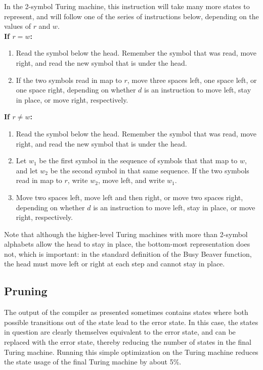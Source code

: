 \documentclass[11pt]{report}
\begin{document}
In the 2-symbol Turing machine, this instruction will take many more states to represent, and will follow one of the series of instructions below, depending on the values of $r$ and $w$. \\

\textbf{If $r = w$:}

\begin{enumerate}

\item Read the symbol below the head. Remember the symbol that was read, move right, and read the new symbol that is under the head. 
\item If the two symbols read in map to $r$, move three spaces left, one space left, or one space right, depending on whether $d$ is an instruction to move left, stay in place, or move right, respectively.

\end{enumerate}

\textbf{If $r \not= w$:}

\begin{enumerate}

\item Read the symbol below the head. Remember the symbol that was read, move right, and read the new symbol that is under the head.
\item Let $w_1$ be the first symbol in the sequence of symbols that that map to $w$, and let $w_2$ be the second symbol in that same sequence. If the two symbols read in map to $r$, write $w_2$, move left, and write $w_1$.
\item Move two spaces left, move left and then right, or move two spaces right, depending on whether $d$ is an instruction to move left, stay in place, or move right, respectively.

\end{enumerate}

Note that although the higher-level Turing machines with more than 2-symbol alphabets allow the head to stay in place, the bottom-most representation does not, which is important: in the standard definition of the Busy Beaver function, the head must move left or right at each step and cannot stay in place.

\subsection{Pruning}

The output of the compiler as presented sometimes contains states where both possible transitions out of the state lead to the error state. In this case, the states in question are clearly themselves equivalent to the error state, and can be replaced with the error state, thereby reducing the number of states in the final Turing machine. Running this simple optimization on the Turing machine reduces the state usage of the final Turing machine by about 5\%.
\end{document}
